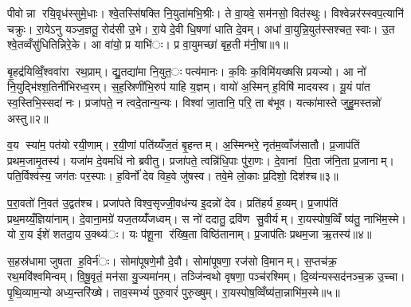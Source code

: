 


पीवोन्ना रयि॒वृध॑स्सुमे॒धाः। श्वे॒तस्सि॑षक्ति नि॒युता॑मभि॒श्रीः। ते वा॒यवे॒ सम॑नसो॒ वित॑स्थुः। विश्वेन्नर॑स्स्वप॒त्यानि॑ चक्रुः। रा॒येऽनु यञ्ज॒ज्ञतू॒ रोद॑सी उ॒भे। रा॒ये दे॒वी धि॒षणा॑ धाति दे॒वम्। अधा॑ वा॒युन्नि॒युत॑स्सश्चत॒ स्वाः। उ॒त श्वे॒तव्वँसु॑धितिन्निरे॒के। आ वा॑यो॒ प्र याभि॑ः। प्र वा॒युमच्छा॑ बृह॒ती म॑नी॒षा॥१॥

बृ॒हद्र॑यिव्विँ॒श्ववा॑रा रथ॒प्राम्। द्यु॒तद्या॑मा नि॒युत॒ः पत्य॑मानः। क॒विः क॒विमि॑यख्षसि प्रयज्यो। आ नो॑ नि॒युद्भि॑श्श॒तिनी॑भिरध्व॒रम्। स॒ह॒स्रिणी॑भि॒रुप॑ याहि य॒ज्ञम्। वायो॑ अ॒स्मिन् ह॒विषि॑ मादयस्व। यू॒यं पा॑त स्व॒स्तिभि॒स्सदा॑ नः। प्रजा॑पते॒ न त्वदे॒तान्य॒न्यः। विश्वा॑ जा॒तानि॒ परि॒ ता ब॑भूव। यत्का॑मास्ते जुहु॒मस्तन्नो॑ अस्तु॥२॥

व॒य स्या॑म॒ पत॑यो रयी॒णाम्। र॒यी॒णां पति॑य्यँज॒तं बृ॒हन्तम्। अ॒स्मिन्भरे॒ नृत॑म॒व्वाँज॑सातौ। प्र॒जाप॑तिं प्रथम॒जामृ॒तस्य॑। यजा॑म दे॒वमधि॑ नो ब्रवीतु। प्रजा॑पते॒ त्वन्नि॑धि॒पाः पु॑रा॒णः। दे॒वानां पि॒ता ज॑नि॒ता प्र॒जानाम्। पति॒र्विश्व॑स्य॒ जग॑तः पर॒स्पाः। ह॒विर्नो॑ देव विह॒वे जु॑षस्व। तवे॒मे लो॒काः प्र॒दिशो॒ दिश॑श्च॥३॥

प॒रा॒वतो॑ नि॒वत॑ उ॒द्वत॑श्च। प्रजा॑पते विश्व॒सृज्जी॒वध॑न्य इ॒दन्नो॑ देव। प्रति॑हर्य ह॒व्यम्। प्र॒जाप॑तिं प्रथ॒मय्यँ॒ज्ञिया॑नाम्। दे॒वाना॒मग्रे॑ यज॒तय्यँ॑जध्वम्। स नो॑ ददातु॒ द्रवि॑ण सु॒वीर्यम्। रा॒यस्पोष॒व्विँ ष्य॑तु॒ नाभि॑म॒स्मे। यो रा॒य ईशे॑ शतदा॒य उ॒क्थ्य॑ः। यः प॑शू॒ना र॑ख्षि॒ता विष्ठि॑तानाम्। प्र॒जाप॑तिः प्रथम॒जा ऋ॒तस्य॑॥४॥

स॒हस्र॑धामा जुषता ह॒विर्न॑ः। सोमा॑पूषणे॒मौ दे॒वौ। सोमा॑पूषणा॒ रज॑सो वि॒मानम्। स॒प्तच॑क्र॒ रथ॒मवि॑श्वमिन्वम्। वि॒षू॒वृतं॒ मन॑सा यु॒ज्यमा॑नम्। तञ्जि॑न्वथो वृषणा॒ पञ्च॑रश्मिम्। दि॒व्य॑न्यस्सद॑नञ्च॒क्र उ॒च्चा। पृ॒थि॒व्याम॒न्यो अध्य॒न्तरि॑ख्षे। ताव॒स्मभ्यं॑ पुरु॒वारं॑ पुरु॒ख्षुम्। रा॒यस्पोष॒व्विँष्य॑ता॒न्नाभि॑म॒स्मे॥५॥

